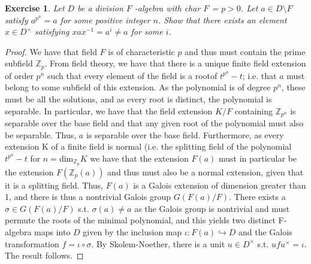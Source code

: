 \documentclass{article}
\newtheorem{exercise}{Exercise}[section]
\begin{document}
\begin{exercise}
Let $D$ be a division $F$ -algebra with char $F$ = $p > 0$. Let $a \in D \setminus F$
satisfy $a^{p^{n}} = a$ for some positive integer $n$. Show that there exists
an element $x \in D^{\times}$ satisfying $xax^{-1} = a^{i} \neq a$ for some $i$.
\end{exercise}

\begin{proof}

We have that field $F$ is of characteristic $p$ and thus must contain the prime subfield $\mathbb{Z}_{p}$. From field theory, we have that there is a unique finite field extension of order $p^{n}$ such that every element of the field is a rootof $t^{p^{n}}-t$; i.e. that $a$ must belong to some subfield of this extension. As the polynomial is of degree $p^{n}$, these must be all the solutions, and as every root is distinct, the polynomial is separable. In particular, we have that the field extension $K/F$ containing $\mathbb{Z}_{p^{n}}$ is separable over the base field and that any given root of the polynomial must also be separable. Thus, $a$ is separable over the base field. Furthermore, as every extension K of a finite field is normal (i.e. the splitting field of the polynomial $t^{p^{n}}-t$ for $n = \text{dim}_{\mathbb{Z}_{p}}K$ we have that the extension $F(a)$ must in particular be the extension $F(\mathbb{Z}_{p}(a))$ and thus must also be a normal extension, given that it is a splitting field. Thus, $F(a)$ is a Galois extension of dimension greater than 1, and there is thus a nontrivial Galois group $G(F(a)/F)$. There exists a $\sigma \in G(F(a)/F)$ s.t. $\sigma(a) \neq a$ as the Galois group is nontrivial and must permute the roots of the minimal polynomial, and this yields two distinct F-algebra maps into $D$ given by the inclusion map $\iota: F(a) \hookrightarrow D$ and the Galois transformation $f = \iota \circ \sigma$. By Skolem-Noether, there is a unit $u \in D^{\times}$ s.t. $uf u^{\times} = \iota$. The result follows. \end{proof}
\end{document}
